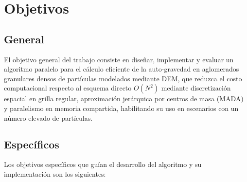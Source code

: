 \documentclass[a4paper,11pt]{book}
\begin{document}
\section{Objetivos}

\subsection{General}

El objetivo general del trabajo consiste en diseñar, implementar y evaluar un algoritmo paralelo para el cálculo eficiente de la auto-gravedad en aglomerados granulares densos de partículas modelados mediante DEM, que reduzca el costo computacional respecto al esquema directo $O(N^2)$ mediante discretización espacial en grilla regular, aproximación jerárquica por centros de masa (MADA) y paralelismo en memoria compartida, habilitando su uso en escenarios con un número elevado de partículas.

\subsection{Específicos}

Los objetivos específicos que guían el desarrollo del algoritmo y su implementación son los siguientes:
\end{document}
